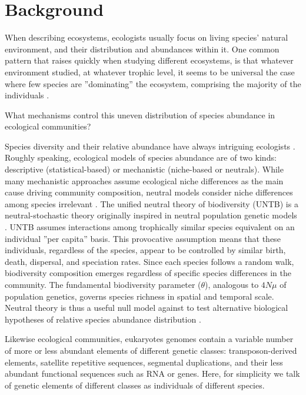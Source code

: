 
\section{Background}

When describing ecosystems, ecologists usually focus on living species' natural environment, and their distribution and abundances within it. One common pattern that raises quickly when studying different ecosystems, is that whatever environment studied, at whatever trophic level, it seems to be universal the case where few species are ''dominating'' the ecosystem, comprising the majority of the individuals \cite{Preston1948,Fisher1943}.

What mechanisms control this uneven distribution of species abundance in ecological communities?

Species diversity and their relative abundance have always intriguing ecologists \cite{McGill2007}. Roughly speaking, ecological models of species abundance are of two kinds: descriptive (statistical-based) or mechanistic (niche-based or neutrals). While many mechanistic approaches assume \gls{ecological niche} differences as the main cause driving community composition, neutral models consider niche differences among species irrelevant \cite{Margurran2004}. The unified neutral theory of biodiversity (UNTB) \cite{Hubbell2001,Rosindell2011} is a neutral-stochastic theory originally inspired in neutral population genetic models \cite{Kimura1985,Wright1931}. UNTB assumes interactions among \gls{trophic}ally similar species equivalent on an individual ''per capita'' basis. This provocative assumption means that these individuals, regardless of the species, appear to be controlled by similar birth, death, dispersal, and speciation rates. Since each species follows a random walk, biodiversity composition emerges regardless of specific species differences in the community. The fundamental biodiversity parameter ($\theta$), analogous to $4N\mu$ of population genetics, governs species richness in spatial and temporal scale. Neutral theory is thus a useful null model against to test alternative biological hypotheses of relative species abundance distribution \cite{Volkov2003,Alonso2006}.

Likewise ecological communities, eukaryotes genomes contain a variable number of more or less abundant elements of different genetic classes: \gls{transposon}-derived elements, satellite repetitive sequences, segmental duplications, and their less abundant functional sequences such as RNA or genes. Here, for simplicity we talk of genetic elements of different classes as individuals of different species.

